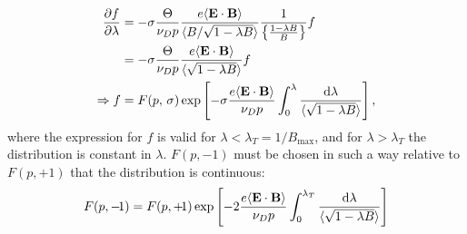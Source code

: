 \documentclass[11pt,a4paper]{article}
\newcommand{\rd}{\ensuremath{\mathrm{d}}}
\newcommand{\sub}[1]{\ensuremath{_{\text{#1}}}}
\renewcommand{\b}[1]{\ensuremath{ {\bf #1 } }}
\begin{document}
\begin{align}
\frac{\partial f}{\partial \lambda} &= -\sigma\frac{\Theta}{\nu_D p} \frac{e\langle \b{E}\cdot\b{B}\rangle}{\langle B/\sqrt{1-\lambda B}\rangle} \frac{1}{\left\{\frac{1-\lambda B}{B}\right\}}f \nonumber \\
&=-\sigma\frac{\Theta}{\nu_D p}\frac{e\langle\b{E}\cdot\b{B}\rangle}{\langle \sqrt{1-\lambda B}\rangle}f \\
\Rightarrow f &= F(p,\,\sigma) \exp\left[- \sigma\frac{e\langle \b{E}\cdot\b{B}\rangle}{\nu_D p}\int_0^\lambda\frac{\rd \lambda}{\langle\sqrt{1-\lambda B}\rangle}\right],
\end{align}
where the expression for $f$ is valid for $\lambda < \lambda_T = 1/B\sub{max}$, and for $\lambda>\lambda_T$ the distribution is constant in $\lambda$. $F(p,-1)$ must be chosen in such a way relative to $F(p,+1)$ that the distribution is continuous:
\begin{align}
F(p,-\!1) = F(p,+\!1)\exp\left[- 2\frac{e\langle \b{E}\cdot\b{B}\rangle}{\nu_D p}\int_0^{\lambda_T}\frac{\rd \lambda}{\langle\sqrt{1-\lambda B}\rangle}\right]
\end{align}
\end{document}
